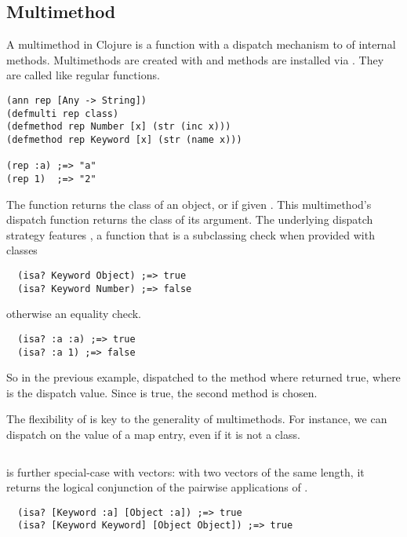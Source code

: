 \subsection{Multimethod}

A multimethod in Clojure is a function with a dispatch mechanism to
of internal methods. Multimethods are created with {}
and methods are installed via {}.
They are called like regular functions.

\begin{verbatim}
(ann rep [Any -> String])
(defmulti rep class)
(defmethod rep Number [x] (str (inc x)))
(defmethod rep Keyword [x] (str (name x)))

(rep :a) ;=> "a"
(rep 1)  ;=> "2"
\end{verbatim}

The  function returns the class of an object, or 
if given . This multimethod's dispatch function returns the class of its
argument. The underlying dispatch strategy features , a function
that is a subclassing check when provided with classes

\begin{verbatim}
  (isa? Keyword Object) ;=> true
  (isa? Keyword Number) ;=> false
\end{verbatim}

otherwise an equality check.

\begin{verbatim}
  (isa? :a :a) ;=> true
  (isa? :a 1) ;=> false
\end{verbatim}

So in the previous example,  dispatched to the method
where  returned true, where  is the dispatch value.
Since  is true, the second method is chosen.

The flexibility of  is key to the generality of multimethods. 
For instance, we can dispatch on the value of
a map entry, even if it is not a class.

\inputminted[firstline=4,lastline=23]{clojure}{code/demo/src/demo/eg5.clj}

 is further special-case with vectors: with two vectors of the
same length, it returns the logical conjunction of the pairwise applications
of .

\begin{verbatim}
  (isa? [Keyword :a] [Object :a]) ;=> true
  (isa? [Keyword Keyword] [Object Object]) ;=> true
\end{verbatim}


